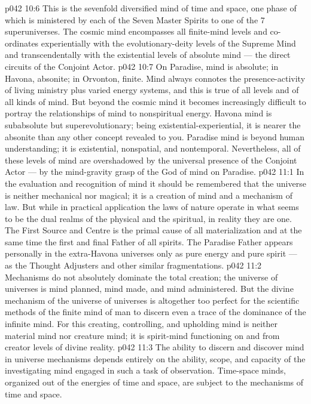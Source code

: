 \vs p042 10:6 \pc {} This is the sevenfold diversified mind of time and space, one phase of which is ministered by each of the Seven Master Spirits to one of the 7 superuniverses. The cosmic mind encompasses all finite\hyp{}mind levels and co\hyp{}ordinates experientially with the evolutionary\hyp{}deity levels of the Supreme Mind and transcendentally with the existential levels of absolute mind --- the direct circuits of the Conjoint Actor.
\vs p042 10:7 On Paradise, mind is absolute; in Havona, absonite; in Orvonton, finite. Mind always connotes the presence\hyp{}activity of living ministry plus varied energy systems, and this is true of all levels and of all kinds of mind. But beyond the cosmic mind it becomes increasingly difficult to portray the relationships of mind to nonspiritual energy. Havona mind is subabsolute but superevolutionary; being existential\hyp{}experiential, it is nearer the absonite than any other concept revealed to you. Paradise mind is beyond human understanding; it is existential, nonspatial, and nontemporal. Nevertheless, all of these levels of mind are overshadowed by the universal presence of the Conjoint Actor --- by the mind\hyp{}gravity grasp of the God of mind on Paradise.
\vs p042 11:1 In the evaluation and recognition of mind it should be remembered that the universe is neither mechanical nor magical; it is a creation of mind and a mechanism of law. But while in practical application the laws of nature operate in what seems to be the dual realms of the physical and the spiritual, in reality they are one. The First Source and Centre is the primal cause of all materialization and at the same time the first and final Father of all spirits. The Paradise Father appears personally in the extra\hyp{}Havona universes only as pure energy and pure spirit --- as the Thought Adjusters and other similar fragmentations.
\vs p042 11:2 \pc Mechanisms do not absolutely dominate the total creation; the universe of universes  is mind planned, mind made, and mind administered. But the divine mechanism of the universe of universes is altogether too perfect for the scientific methods of the finite mind of man to discern even a trace of the dominance of the infinite mind. For this creating, controlling, and upholding mind is neither material mind nor creature mind; it is spirit\hyp{}mind functioning on and from creator levels of divine reality.
\vs p042 11:3 The ability to discern and discover mind in universe mechanisms depends entirely on the ability, scope, and capacity of the investigating mind engaged in such a task of observation. Time\hyp{}space minds, organized out of the energies of time and space, are subject to the mechanisms of time and space.
